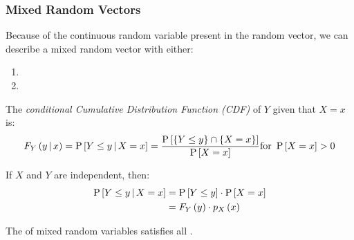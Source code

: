 		\subsubsection{Mixed Random Vectors} \label{subsubsec:Conditional Probability Mixed Random Vectors}
		Because of the continuous random variable present in the random vector, we can describe a mixed random vector with either:
			\begin{enumerate}
				\item {}
				\item {}
			\end{enumerate}
			\begin{definition} \label{def:Mixed Random Vector-Conditional CDF}
				The \emph{conditional Cumulative Distribution Function (CDF)} of $Y$ given that $X = x$ is:
				\begin{equation} \label{eq:Mixed Random Vector-Conditional CDF}
					F_{Y} \left( y \operatorname{\vert} x \right) = \operatorname{\operatorname{P}} \left[ Y \leq y \operatorname{\vert} X=x \right] = \frac{\operatorname{\operatorname{P}} \left[ \lbrace Y \leq y \rbrace \cap \lbrace X = x \rbrace \right]}{\operatorname{\operatorname{P}} \left[ X = x \right]} \text{for } \operatorname{\operatorname{P}} \left[ X = x \right] >0
				\end{equation}
				\begin{remark}
					If $X$ and $Y$ are independent, then:
					\begin{equation} \label{eq: Mixed Random Vector-Independent-Conditional CDF}
						\begin{aligned}
							\operatorname{\operatorname{P}} \left[ Y \leq y \operatorname{\vert} X=x \right] &= \operatorname{\operatorname{P}} \left[ Y \leq y \right] \cdot \operatorname{\operatorname{P}} \left[ X = x \right] \\
							&= F_{Y} \left( y \right) \cdot p_{X} \left( x \right)
						\end{aligned}
					\end{equation}
				\end{remark}
				\begin{remark}
					The  of mixed random variables satisfies all .
				\end{remark}
			\end{definition}

